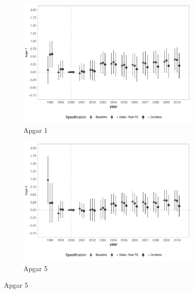 \begin{figure}[h]
    \begin{center}
    \caption{Causal Effects on Birth Outcomes}\label{fig:birth}
    \begin{subfigure}{0.48\textwidth}
        \caption{\scriptsize Apgar 1}\label{fig:birth_a}
        \centering
        \includegraphics[width=\textwidth]{plots/birth/birth_apgar1_dist_ec29_baseline_dist_ec29_baseline_full.pdf}
    \end{subfigure}
    \begin{subfigure}{0.48\textwidth}
        \centering
        \caption{\scriptsize Apgar 5}\label{fig:birth_b}
        \includegraphics[width=\textwidth]{plots/birth/birth_apgar5_dist_ec29_baseline_dist_ec29_baseline_full.pdf}
    \end{subfigure}

\end{center}
\end{figure}
